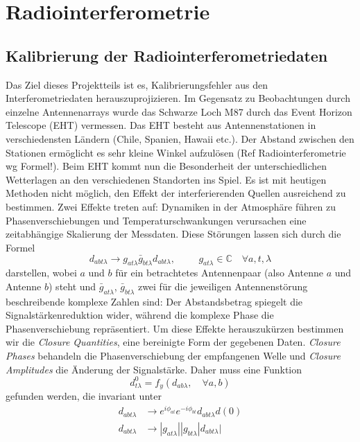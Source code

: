 
\section{Radiointerferometrie}
\subsection{Kalibrierung der Radiointerferometriedaten}
Das Ziel dieses Projektteils ist es, Kalibrierungsfehler aus den Interferometriedaten herauszuprojizieren. Im Gegensatz zu Beobachtungen durch einzelne Antennenarrays wurde das Schwarze Loch M87 durch das Event Horizon Telescope (EHT) vermessen. Das EHT besteht aus Antennenstationen in verschiedensten Ländern (Chile, Spanien, Hawaii etc.). Der Abstand zwischen den Stationen ermöglicht es sehr kleine Winkel aufzulösen (Ref Radiointerferometrie wg Formel!).
Beim EHT kommt nun die Besonderheit der unterschiedlichen Wetterlagen an den verschiedenen Standorten ins Spiel.
Es ist mit heutigen Methoden nicht möglich, den Effekt der interferierenden Quellen ausreichend zu bestimmen. Zwei Effekte treten auf: Dynamiken in der Atmosphäre führen zu Phasenverschiebungen und Temperaturschwankungen verursachen eine zeitabhängige Skalierung der Messdaten. Diese Störungen lassen sich durch die Formel
$$d_{abt\lambda}\rightarrow g_{at\lambda} \bar{g}_{bt\lambda}d_{abt\lambda}, \hspace{1cm} g_{at \lambda} \in \mathbb{C} \quad \forall a,t,\lambda $$
darstellen, wobei $a$ und $b$ für ein betrachtetes Antennenpaar (also Antenne $a$ und Antenne $b$) steht und $\bar{g}_{at\lambda}$,  $\bar{g}_{bt\lambda}$ zwei für die jeweiligen Antennenstörung beschreibende komplexe Zahlen sind: Der Abstandsbetrag spiegelt die Signalstärkenreduktion wider, während die komplexe Phase die Phasenverschiebung repräsentiert.
Um diese Effekte herauszukürzen bestimmen wir die \emph{Closure Quantities}, eine bereinigte Form der gegebenen Daten. \emph{Closure Phases} behandeln die Phasenverschiebung der empfangenen Welle und \emph{Closure Amplitudes} die Änderung der Signalstärke. Daher muss eine Funktion
\begin{equation}
d^0_{t\lambda}=f_{y}(d_{ab\lambda},\quad \forall a,b)
\end{equation}
gefunden werden, die invariant unter
\begin{align}
d_{abt\lambda} &\rightarrow e^{i \phi_{at}} e^{-i\phi_{bt}} d_{abt\lambda}d(0)\\
d_{abt\lambda}&\rightarrow|g_{at\lambda}||g_{bt\lambda}|d_{abt\lambda}|
\end{align}
